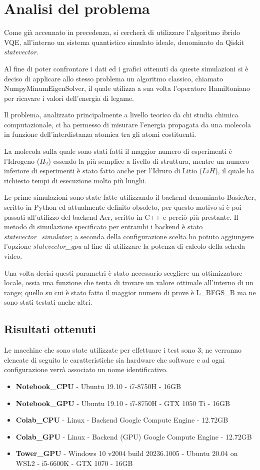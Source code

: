 \section{Analisi del problema}
Come già accennato in precedenza, si cercherà di utilizzare l'algoritmo ibrido VQE, all'interno un sistema quantistico simulato ideale, denominato da Qiskit \textit{statevector}.

Al fine di poter confrontare i dati ed i grafici ottenuti da queste simulazioni si è deciso di applicare allo stesso problema un algoritmo classico, chiamato NumpyMinumEigenSolver, il quale utilizza a sua volta l'operatore Hamiltoniano per ricavare i valori dell'energia di legame.

Il problema, analizzato principalmente a livello teorico da chi studia chimica computazionale, ci ha permesso di misurare l'energia propagata da una molecola in funzione dell'interdistanza atomica tra gli atomi costituenti.

La molecola sulla quale sono stati fatti il maggior numero di esperimenti è l'Idrogeno ($H_2$) essendo la più semplice a livello di struttura, mentre un numero inferiore di esperimenti è stato fatto anche per l'Idruro di Litio ($LiH$), il quale ha richiesto tempi di esecuzione molto più lunghi.

Le prime simulazioni sono state fatte utilizzando il backend denominato BasicAer, scritto in Python ed attualmente definito obsoleto, per questo motivo si è poi passati all'utilizzo del backend Aer, scritto in C++ e perciò più prestante.
Il metodo di simulazione specificato per entrambi i backend è stato \textit{statevector\_simulator}; a seconda della configurazione scelta ho potuto aggiungere l'opzione \textit{statevector\_gpu} al fine di utilizzare la potenza di calcolo della scheda video.

Una volta decisi questi parametri è stato necessario scegliere un ottimizzatore locale, ossia una funzione che tenta di trovare un valore ottimale all'interno di un range; quello su cui è stato fatto il maggior numero di prove è L\_BFGS\_B ma ne sono stati testati anche altri.

\subsection{Risultati ottenuti}
Le macchine che sono state utilizzate per effettuare i test sono 3; ne verranno elencate di seguito le caratteristiche sia hardware che software e ad ogni configurazione verrà associato un nome identificativo.
\small
\begin{itemize}
    \item \textbf{Notebook\_CPU} - Ubuntu 19.10 - i7-8750H - 16GB
    \item \textbf{Notebook\_GPU} - Ubuntu 19.10 - i7-8750H - GTX 1050 Ti - 16GB
    \item \textbf{Colab\_CPU} - Linux - Backend Google Compute Engine - 12.72GB
    \item \textbf{Colab\_GPU} - Linux - Backend (GPU) Google Compute Engine - 12.72GB
    \item \textbf{Tower\_GPU} - Windows 10 v2004 build 20236.1005 - Ubuntu 20.04 on WSL2 - i5-6600K - GTX 1070 - 16GB
\end{itemize}
\normalsize


